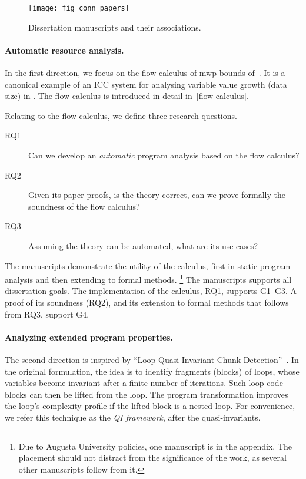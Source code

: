 \begin{figure}[p]
\texttt{[image: fig\_conn\_papers]}\vspace{1em}
\caption[Dissertation manuscripts and their associations]
{Dissertation manuscripts and their associations.}
\label{fig:conn_papers}
\end{figure}

\paragraph*{Automatic resource analysis.}

In the first direction, we focus on the flow calculus of mwp-bounds of~\textcite{jones2009}.
It is a canonical example of an ICC system for analysing variable value growth (data size) in .
The flow calculus is introduced in detail in~\autoref{flow-calculus}.

Relating to the flow calculus, we define three research questions.
\begin{description}
\item[RQ1] Can we develop an \emph{automatic} program analysis based on the flow calculus?
\item[RQ2] Given its paper proofs, is the theory correct, \ie can we prove formally the soundness of the flow calculus?
\item[RQ3] Assuming the theory can be automated, what are its use cases?
\end{description}

The manuscripts demonstrate the utility of the calculus, first in static program analysis and then extending to formal methods.%
\footnote{Due to Augusta University policies, one manuscript is in the appendix.
The placement should not distract from the significance of the work, as several other manuscripts follow from it.}
The manuscripts supports all dissertation goals.
The implementation of the calculus, RQ1, supports G1--G3.
A proof of its soundness (RQ2), and its extension to formal methods that follows from RQ3, support G4.

\paragraph*{Analyzing extended program properties.}

The second direction is inspired by \enquote{Loop Quasi-Invariant Chunk Detection}~\cite{moyen20172}.
In the original formulation, the idea is to identify fragments (blocks) of loops, whose variables become invariant after a finite number of iterations.
Such loop  code blocks can then be lifted from the loop.
The program transformation improves the loop's complexity profile if the lifted block is a nested loop.
For convenience, we refer this technique as the \emph{QI framework}, after the quasi-invariants.

